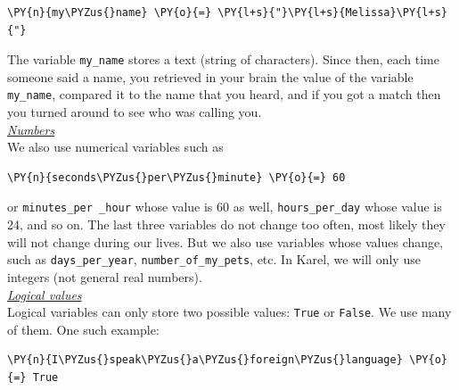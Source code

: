 \begin{bbox}
\begin{Verbatim}[commandchars=\\\{\}]
\PY{n}{my\PYZus{}name} \PY{o}{=} \PY{l+s}{"}\PY{l+s}{Melissa}\PY{l+s}{"}
\end{Verbatim}
\end{bbox}
\vspace{6mm}

\noindent
The variable {\tt my\_name} stores a text (string of characters). 
Since then, each time someone said a name, you retrieved in your brain the value of the variable
{\tt my\_name}, compared it to the name that you heard, and if you got a match then you turned around 
to see who was calling you. \\

\noindent
\underline{\em Numbers}\\

\noindent
We also use numerical variables such as\\

\begin{bbox}
\begin{Verbatim}[commandchars=\\\{\}]
\PY{n}{seconds\PYZus{}per\PYZus{}minute} \PY{o}{=} 60
\end{Verbatim}
\end{bbox}
\vspace{6mm}

\noindent
or {\tt minutes\_per \_hour} whose value is 60 as well, 
{\tt hours\_per\_day} whose value is 24, and so on. The last three variables do not change 
too often, most likely they will not change during our lives. But we also use variables whose 
values change, such as {\tt days\_per\_year}, {\tt number\_of\_my\_pets}, etc. In Karel, we
will only use integers (not general real numbers).\\

\noindent
\underline{\em Logical values}\\

\noindent
Logical variables can only store two possible values:
{\tt True} or {\tt False}. We use many of them. One such example: \\

\begin{bbox}
\begin{Verbatim}[commandchars=\\\{\}]
\PY{n}{I\PYZus{}speak\PYZus{}a\PYZus{}foreign\PYZus{}language} \PY{o}{=} True
\end{Verbatim}
\end{bbox}
\vspace{6mm}

